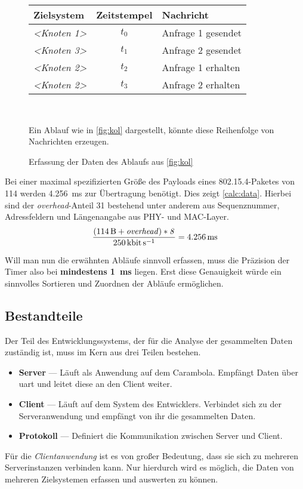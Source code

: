 \begin{figure}[!ht]
\centering
\par\begin{tabu}{l c l}
Zielsystem & Zeitstempel & Nachricht\\
\hline
\emph{<Knoten 1>} & \emph{$t_0$} & Anfrage 1 gesendet\\ 
\emph{<Knoten 3>} & \emph{$t_1$} & Anfrage 2 gesendet\\
\emph{<Knoten 2>} & \emph{$t_2$} & Anfrage 1 erhalten\\
\emph{<Knoten 2>} & \emph{$t_3$} & Anfrage 2 erhalten\\
\hline
\end{tabu}\\
\caption{Erfassung der Daten des Ablaufs aus \autoref{fig:kol}}{Ein Ablauf
wie in \autoref{fig:kol} dargestellt, könnte diese Reihenfolge von
Nachrichten erzeugen.}
\label{fig:kolmsg}
\end{figure}

Bei einer maximal spezifizierten Größe des Payloads eines
802.15.4-Paketes von \SI{114}{\byte} werden \SI{4.256}{\milli\second}
zur Übertragung benötigt. Dies zeigt \autoref{calc:data}. Hierbei sind der
\emph{overhead}-Anteil \SI{31}{\byte} bestehend unter anderem aus
Sequenznummer, Adressfeldern und Längenangabe aus PHY- und
MAC-Layer.
\begin{align}\label{calc:data}
\frac{(\SI{114}{\byte}+\mathit{overhead)*8}}{\SI{250}{\kilo\bit\per\second}}=\SI{4.256}{\milli\second}
\end{align}

Will man nun die erwähnten Abläufe sinnvoll erfassen, muss die Präzision der
Timer also bei \textbf{mindestens \SI{1}{\milli\second}} liegen. Erst diese
Genauigkeit würde ein sinnvolles Sortieren und Zuordnen der Abläufe ermöglichen.

\subsection{Bestandteile}\label{subs:best}
\begin{minipage}[c]{\textwidth}
Der Teil des Entwicklungssystems, der für die Analyse der gesammelten Daten
zuständig ist, muss im Kern aus drei Teilen bestehen.
\begin{itemize}
  \item \textbf{Server} --- Läuft als Anwendung auf dem Carambola. Empfängt
  Daten über \gls{uart} und leitet diese an den Client weiter.
  \item \textbf{Client} --- Läuft auf dem System des Entwicklers. Verbindet sich
  zu der Serveranwendung und empfängt von ihr die gesammelten Daten.
  \item \textbf{Protokoll} --- Definiert die Kommunikation zwischen Server und
  Client.
\end{itemize}
\end{minipage}\par
Für die \emph{Clientanwendung} ist es von großer Bedeutung, dass sie sich zu
mehreren Serverinstanzen verbinden kann. Nur hierdurch wird es möglich, die
Daten von mehreren Zielsystemen erfassen und auswerten zu können.

